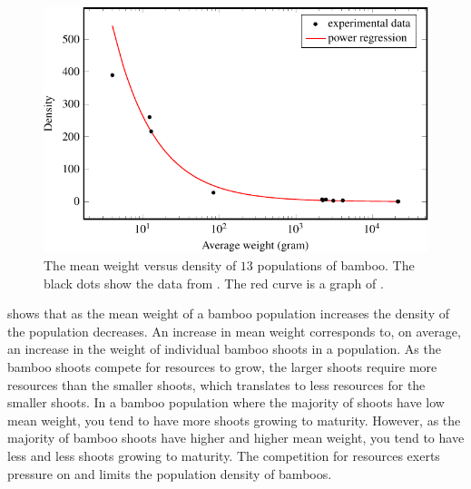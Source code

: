 \documentclass[a4paper,oneside,12pt]{article}
\begin{document}
{\begin{solution}
\begin{figure}[!htbp]
\centering
\includegraphics[scale=1.1]{image/12/bamboo.pdf}
\caption{%
  The mean weight versus density of $13$ populations of bamboo.  The
  black dots show the data from .  The red
  curve is a graph of
  .
}
\label{fig:logarithm:bamboo}
\end{figure}

 shows that as the mean weight of a
bamboo population increases the density of the population decreases.
An increase in mean weight corresponds to, on average, an increase in
the weight of individual bamboo shoots in a population.  As the bamboo
shoots compete for resources to grow, the larger shoots require more
resources than the smaller shoots, which translates to less resources
for the smaller shoots.  In a bamboo population where the majority of
shoots have low mean weight, you tend to have more shoots growing to
maturity.  However, as the majority of bamboo shoots have higher and
higher mean weight, you tend to have less and less shoots growing to
maturity.  The competition for resources exerts pressure on and limits
the population density of bamboos.
\end{solution}
}{}

\begin{table}[!htbp]
\centering

\caption{%
  The distance to the Sun versus the orbital period of a planet.
  Distance is measured in gigametres, where one gigametre~(or $1$~Gm)
  is equivalent to $10^6$ kilometres.  The orbital period of a planet
  is the number of Earth days required for the planet to complete one
  orbit around the Sun.
}
\label{tab:logarithm:orbital_period}
\end{table}
\end{document}
